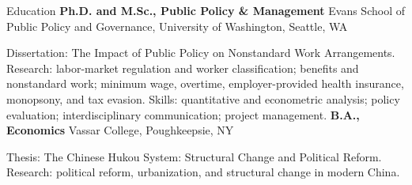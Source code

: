 \begin{rubric}{Education}
\entry*[2016 - 2021]%
    \textbf{Ph.D. and M.Sc., Public Policy \& Management} Evans School of Public Policy and Governance, University of Washington, Seattle, WA
    \par Dissertation: The Impact of Public Policy on Nonstandard Work Arrangements. Research: labor-market regulation and worker classification; benefits and nonstandard work; minimum wage, overtime, employer-provided health insurance, monopsony, and tax evasion. Skills: quantitative and econometric analysis; policy evaluation; interdisciplinary communication; project management.
\entry*[2012 - 2016]%
    \textbf{B.A., Economics} Vassar College, Poughkeepsie, NY
    \par Thesis: The Chinese Hukou System: Structural Change and Political Reform. Research: political reform, urbanization, and structural change in modern China.
\end{rubric}
